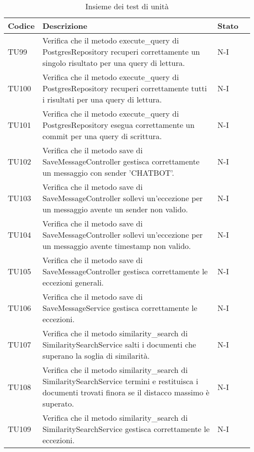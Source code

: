 \begin{table}[h!]
    \centering
    \renewcommand{\arraystretch}{1.5}
    \begin{tabularx}{\textwidth}{|p{}|X|p{}|p{}|}\hline
    \rowcolor[HTML]{FFD700}
    \textbf{Codice} & \textbf{Descrizione} & \textbf{Stato} \\ \hline
    TU99 & Verifica che il metodo execute\_query di PostgresRepository recuperi correttamente un singolo risultato per una query di lettura. &  N-I \\ \hline
    TU100 & Verifica che il metodo execute\_query di PostgresRepository recuperi correttamente tutti i risultati per una query di lettura. &  N-I \\ \hline
    TU101 & Verifica che il metodo execute\_query di PostgresRepository esegua correttamente un commit per una query di scrittura. &  N-I \\ \hline
    TU102 & Verifica che il metodo save di SaveMessageController gestisca correttamente un messaggio con sender 'CHATBOT'. &  N-I \\ \hline
    TU103 & Verifica che il metodo save di SaveMessageController sollevi un'eccezione per un messaggio avente un sender non valido. &  N-I \\ \hline
    TU104 & Verifica che il metodo save di SaveMessageController sollevi un'eccezione per un messaggio avente timestamp non valido. &  N-I \\ \hline
    TU105 & Verifica che il metodo save di SaveMessageController gestisca correttamente le eccezioni generali. &  N-I \\ \hline
    TU106 & Verifica che il metodo save di SaveMessageService gestisca correttamente le eccezioni. &  N-I \\ \hline
    TU107 & Verifica che il metodo similarity\_search di SimilaritySearchService salti i documenti che superano la soglia di similarità. &  N-I \\ \hline
    TU108 & Verifica che il metodo similarity\_search di SimilaritySearchService termini e restituisca i documenti trovati finora se il distacco massimo è superato. &  N-I \\ \hline
    TU109 & Verifica che il metodo similarity\_search di SimilaritySearchService gestisca correttamente le eccezioni. &  N-I \\ \hline

    \end{tabularx}
    \caption{Insieme dei test di unità}
\end{table}

